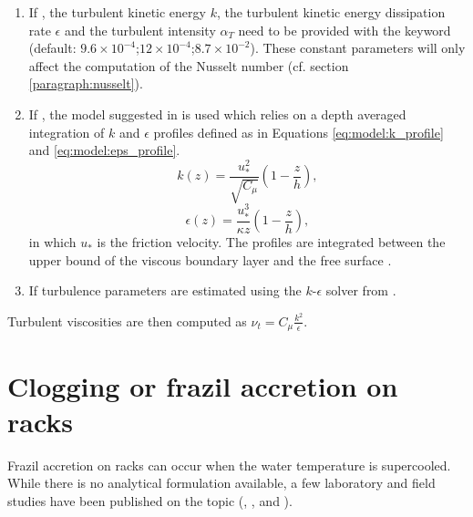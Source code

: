 \begin{enumerate}
\item If , 
the turbulent kinetic energy $k$, the turbulent kinetic energy dissipation rate $\epsilon$
 and the turbulent intensity $\alpha_{T}$ need 
to be provided with the keyword
 (default: $9.6 \times 10^{-4}$;$12 \times 10^{-4}$;$8.7 \times 10^{-2}$).
These constant parameters will only affect the computation of the Nusselt number
 (cf. section \ref{paragraph:nusselt}).
\item If , the model
suggested in \cite{shen_JHR_2010} is used which
relies on a depth averaged integration of $k$ and $\epsilon$
profiles defined as in Equations \eqref{eq:model:k_profile} and \eqref{eq:model:eps_profile}.
\begin{equation}
k(z)=\frac{u_{*}^{2}}{\sqrt{C_{\mu}}}(1-\frac{z}{h}),
\label{eq:model:k_profile}
\end{equation}
\begin{equation}
\epsilon (z)=\frac{u_{*}^{3}}{\kappa z }(1-\frac{z}{h}),
\label{eq:model:eps_profile}
\end{equation}
in which $u_{*}$ is the friction velocity.
The profiles are integrated between the upper bound of the
viscous boundary layer and the free surface \cite{shen_JHR_2010}.
\item If  turbulence parameters
are estimated using the $k$-$\epsilon$ solver from .
\end{enumerate}

Turbulent viscosities are then computed as $\nu_{t} = C_{\mu} \frac{k^2}{\epsilon}$.

\section{Clogging or frazil accretion on racks}
\label{chapter:clogging}

Frazil accretion on racks can occur when the water temperature is supercooled. While there is no analytical formulation available, a few laboratory and field studies have been published on the topic (\cite{daly1991frazil}, \cite{andersson1992frazil}, \cite{andersson1992laboratory} and \cite{richard2008multiple}).\newline

